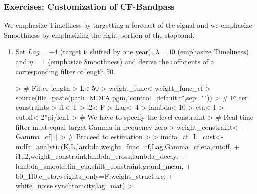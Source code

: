 \documentclass[a4paper]{book}
\begin{document}
\subsubsection{Exercises: Customization of CF-Bandpass}

We emphasize Timeliness by targetting a forecast of the signal and we emphasize Smoothness by emphasizing the right portion of the stopband.
\begin{enumerate}
\item Set $Lag=-4$ (target is shifted by one year), $\lambda=10$ (emphasize Timeliness) and $\eta=1$ (emphasize Smoothness) and derive the cofficients of a corresponding filter of length 50.
\begin{Schunk}
\begin{Sinput}
> # Filter length
> L<-50
> weight_func<-weight_func_cf  
> source(file=paste(path_MDFA.pgm,"control_default.r",sep=""))
> # Filter constraints
> i1<-T
> i2<-F
> Lag<--4
> lambda<-10
> eta<-1
> cutoff<-2*pi/len1
> # We have to specify the level-constraint
> #   Real-time filter must equal target-Gamma in frequency zero
> weight_constraint<-Gamma_cf[1]
> # Proceed to estimation
> 
> imdfa_cf_L_cust<-mdfa_analytic(K,L,lambda,weight_func_cf,Lag,Gamma_cf,eta,cutoff,
+                         i1,i2,weight_constraint,lambda_cross,lambda_decay,
+                         lambda_smooth,lin_eta,shift_constraint,grand_mean,
+                         b0_H0,c_eta,weights_only=F,weight_structure,
+                         white_noise,synchronicity,lag_mat)
> 
\end{Sinput}
\end{Schunk}

\end{enumerate}
\end{document}
